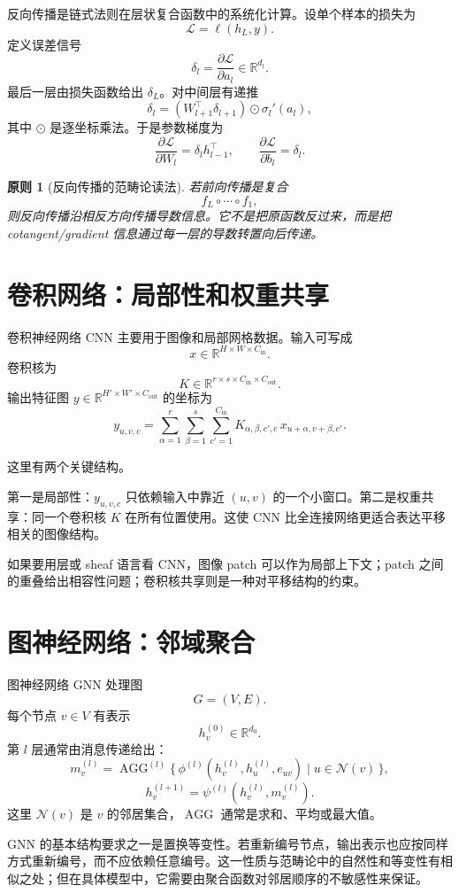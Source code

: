 \documentclass[UTF8,11pt,fontset=none]{ctexart}
\newtheorem{principle}[definition]{原则}
\newcommand{\R}{\mathbb{R}}
\newcommand{\Loss}{\mathcal L}
\begin{document}
反向传播是链式法则在层状复合函数中的系统化计算。设单个样本的损失为
\[
\Loss=\ell(h_L,y).
\]
定义误差信号
\[
\delta_l=\frac{\partial \Loss}{\partial a_l}\in\R^{d_l}.
\]
最后一层由损失函数给出 \(\delta_L\)。对中间层有递推
\[
\delta_l=(W_{l+1}^\top\delta_{l+1})\odot \sigma_l'(a_l),
\]
其中 \(\odot\) 是逐坐标乘法。于是参数梯度为
\[
\frac{\partial \Loss}{\partial W_l}=\delta_l h_{l-1}^\top,
\qquad
\frac{\partial \Loss}{\partial b_l}=\delta_l.
\]

\begin{principle}[反向传播的范畴论读法]
若前向传播是复合
\[
f_L\circ\cdots\circ f_1,
\]
则反向传播沿相反方向传播导数信息。它不是把原函数反过来，而是把 cotangent/gradient 信息通过每一层的导数转置向后传递。
\end{principle}

\section{卷积网络：局部性和权重共享}

卷积神经网络 CNN 主要用于图像和局部网格数据。输入可写成
\[
x\in\R^{H\times W\times C_{\mathrm{in}}}.
\]
卷积核为
\[
K\in\R^{r\times s\times C_{\mathrm{in}}\times C_{\mathrm{out}}}.
\]
输出特征图 \(y\in\R^{H'\times W'\times C_{\mathrm{out}}}\) 的坐标为
\[
y_{u,v,c}
=
\sum_{\alpha=1}^r\sum_{\beta=1}^s\sum_{c'=1}^{C_{\mathrm{in}}}
K_{\alpha,\beta,c',c}\,
x_{u+\alpha,v+\beta,c'}.
\]

这里有两个关键结构。

第一是局部性：\(y_{u,v,c}\) 只依赖输入中靠近 \((u,v)\) 的一个小窗口。第二是权重共享：同一个卷积核 \(K\) 在所有位置使用。这使 CNN 比全连接网络更适合表达平移相关的图像结构。

如果要用层或 sheaf 语言看 CNN，图像 patch 可以作为局部上下文；patch 之间的重叠给出相容性问题；卷积核共享则是一种对平移结构的约束。

\section{图神经网络：邻域聚合}

图神经网络 GNN 处理图
\[
G=(V,E).
\]
每个节点 \(v\in V\) 有表示
\[
h_v^{(0)}\in\R^{d_0}.
\]
第 \(l\) 层通常由消息传递给出：
\[
m_v^{(l)}
=
\operatorname{AGG}^{(l)}
\{\,\phi^{(l)}(h_v^{(l)},h_u^{(l)},e_{uv})\mid u\in \mathcal N(v)\,\},
\]
\[
h_v^{(l+1)}
=
\psi^{(l)}(h_v^{(l)},m_v^{(l)}).
\]
这里 \(\mathcal N(v)\) 是 \(v\) 的邻居集合，\(\operatorname{AGG}\) 通常是求和、平均或最大值。

GNN 的基本结构要求之一是置换等变性。若重新编号节点，输出表示也应按同样方式重新编号，而不应依赖任意编号。这一性质与范畴论中的自然性和等变性有相似之处；但在具体模型中，它需要由聚合函数对邻居顺序的不敏感性来保证。
\end{document}
